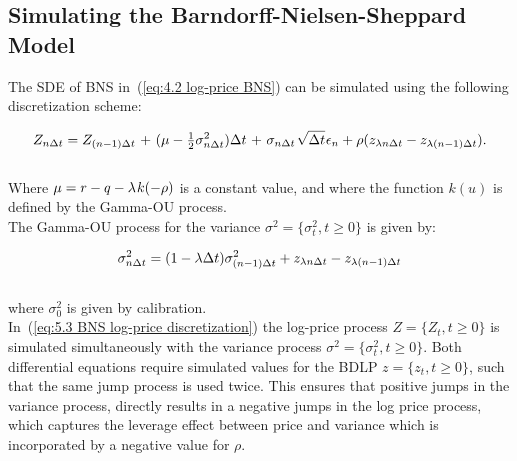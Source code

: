 
\subsection{Simulating the Barndorff-Nielsen-Sheppard Model}

The SDE of BNS in~(\ref{eq:4.2 log-price BNS}) can be simulated using the following discretization scheme:

\begin{equation}
    Z_{n\Delta t} = Z_{(n-1)\Delta t}\hspace{0.1em} +\hspace{0.1em} (\mu - \tfrac{1}{2} \sigma_{n\Delta t}^2)\Delta t\hspace{0.1em} +\hspace{0.1em} \sigma_{n\Delta t}\hspace{0.1em} \sqrt{\Delta t}\hspace{0.05em} \epsilon_{n} + \rho(z_{\lambda n\Delta t}-z_{\lambda (n-1)\Delta t}).
\label{eq:5.3 BNS log-price discretization}
\end{equation}\\

Where $\mu = r - q - \lambda \hspace{0.08em} k(-\rho)$ is a constant value, and where the function $k(u)$ is defined by the Gamma-OU process.\\

The Gamma-OU process for the variance $\sigma^2=\{\sigma_{t}^2,t\geq 0\}$ is given by:

\begin{equation}
\sigma_{n\Delta t}^2 = (1 - \lambda \Delta t) \sigma_{(n-1)\Delta t}^2 + z_{\lambda n \Delta t}-z_{\lambda (n-1)\Delta t} \notag\\
\label{eq:5-3 BNS variance discretization}
\end{equation}\\

where $\sigma_{0}^2$ is given by calibration.\\

In~(\ref{eq:5.3 BNS log-price discretization}) the log-price process $Z = \{ Z_{t}, t \geq 0\}$ is simulated simultaneously with the variance process $\sigma^2=\{\sigma_{t}^2,t\geq 0\}$. Both differential equations require simulated values for the BDLP $z=\{{z}_t,t\geq 0\}$, such that the same jump process is used twice. This ensures that positive jumps in the variance process, directly results in a negative jumps in the log price process, which captures the leverage effect between price and variance which is incorporated by a negative value for $\rho$.\\


